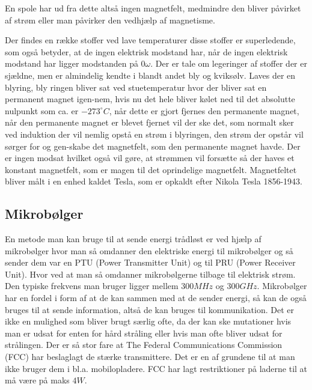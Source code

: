 En spole har ud fra dette altså ingen magnetfelt, medmindre den bliver påvirket af strøm eller man påvirker den vedhjælp af magnetisme. 

Der findes en række stoffer ved lave temperaturer disse stoffer er superledende, som også betyder, at de ingen elektrisk modstand har, når de ingen elektrisk modstand har ligger modstanden på $0 \omega$. Der er tale om legeringer af stoffer der er sjældne, men er almindelig kendte i blandt andet bly og kviksølv. Laves der en blyring, bly ringen bliver sat ved stuetemperatur hvor der bliver sat en permanent magnet igen-nem, hvis nu det hele bliver kølet ned til det absolutte nulpunkt som ca. er $-273^\circ C$, når dette er gjort fjernes den permanente magnet, når den permanente magnet er blevet fjernet vil der ske det, som normalt sker ved induktion der vil nemlig opstå en strøm i blyringen, den strøm der opstår vil sørger for og gen-skabe det magnetfelt, som den permanente magnet havde. Der er ingen modsat hvilket også vil gøre, at strømmen vil forsætte så der haves et konstant magnetfelt, som er magen til det oprindelige magnetfelt. Magnetfeltet bliver målt i en enhed kaldet Tesla, som er opkaldt efter Nikola Tesla 1856-1943. \cite{spoler}


\subsection{Mikrobølger}

En metode man kan bruge til at sende energi trådløst er ved hjælp af mikrobølger hvor man så omdanner den elektriske energi til mikrobølger og så sender dem var en PTU (Power Transmitter Unit) og til PRU (Power Receiver Unit). Hvor ved at man så omdanner mikrobølgerne tilbage til elektrisk strøm. Den typiske frekvens man bruger ligger mellem $300 MHz$ og $300 GHz$. Mikrobølger har en fordel i form af at de kan sammen med at de sender energi, så kan de også bruges til at sende information, altså de kan bruges til kommunikation.  Det er ikke en mulighed som bliver brugt særlig ofte, da der kan ske mutationer hvis man er udsat for enten for hård stråling eller hvis man ofte bliver udsat for strålingen. Der er så stor fare at The Federal Communications Commission (FCC) har beslaglagt de stærke transmittere. Det er en af grundene til at man ikke bruger dem i bl.a. mobilopladere. FCC har lagt restriktioner på laderne til at må være på maks $4 W$. \cite{mikro}

